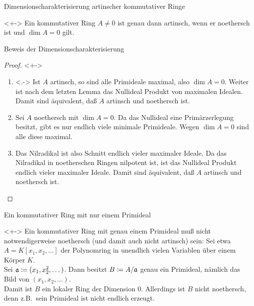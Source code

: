 \begin{frame}{Dimensionscharakterisierung artinscher kommutativer Ringe}
	\begin{theorem}<+->
		Ein kommutativer Ring \(A \neq 0\) ist genau dann artinsch, wenn er
		noethersch ist und \(\dim A = 0\) gilt.
	\end{theorem}
\end{frame}

\begin{frame}{Beweis der Dimensionscharakterisierung}
	\begin{proof}<+->
		\begin{enumerate}[<+->]
		\item<.->
			Ist \(A\) artinsch, so sind alle Primideale maximal, also \(\dim
			A = 0\). Weiter ist nach dem letzten Lemma das Nullideal Produkt
			von maximalen Idealen. Damit sind äquivalent, daß \(A\) artinsch und
			noethersch ist.
		\item
			Sei \(A\) noethersch mit \(\dim A = 0\). Da das Nullideal eine
			Primärzerlegung besitzt, gibt es nur endlich viele minimale
			Primideale. Wegen \(\dim A = 0\) sind alle diese maximal.
		\item
			Das Nilradikal ist also Schnitt endlich vieler maximaler Ideale.
			Da das Nilradikal in noetherschen Ringen nilpotent ist, ist
			das Nullideal Produkt endlich vieler
			maximaler Ideale. Damit sind äquivalent, daß \(A\) artinsch und
			noethersch ist.
			\qedhere
		\end{enumerate}
	\end{proof}
\end{frame}

\begin{frame}{Ein kommutativer Ring mit nur einem Primideal}
	\begin{example}<+->
		Ein kommutativer Ring mit genau einem Primideal muß nicht
		notwendigerweise noethersch (und damit auch nicht artinsch) sein: Sei
		etwa \(A = K[x_1, x_2, \dotsc]\) der Polynomring in unendlich vielen
		Variablen über einem Körper \(K\).
		\\
		Sei \(\mathfrak{a} \coloneqq (x_1, x_2^2, \dotsc)\). Dann besitzt
		\(B \coloneqq A/\mathfrak{a}\) genau ein Primideal, nämlich das Bild von
		\((x_1, x_2, \dotsc)\).
		\\
		Damit ist \(B\) ein lokaler Ring der Dimension \(0\). Allerdings ist
		\(B\) nicht noethersch, denn z.B.~sein Primideal ist nicht endlich
		erzeugt.
	\end{example}
\end{frame}

